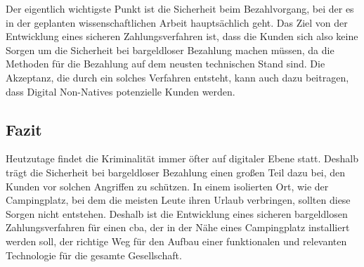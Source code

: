 Der eigentlich wichtigste Punkt ist die Sicherheit beim Bezahlvorgang, bei der es in der geplanten wissenschaftlichen 
Arbeit hauptsächlich geht. Das Ziel von der Entwicklung eines sicheren Zahlungsverfahren ist, dass die Kunden sich
also keine Sorgen um die Sicherheit bei bargeldloser Bezahlung machen müssen, da die Methoden für die Bezahlung 
auf dem neusten technischen Stand sind. Die Akzeptanz, die durch ein solches Verfahren entsteht, kann auch dazu beitragen,
dass Digital Non-Natives potenzielle Kunden werden.

\subsection{Fazit}

Heutzutage findet die Kriminalität immer öfter auf digitaler Ebene statt. Deshalb trägt die Sicherheit bei 
bargeldloser Bezahlung einen großen Teil dazu bei, den Kunden vor solchen Angriffen zu schützen. In einem isolierten Ort, wie der Campingplatz, bei dem die meisten 
Leute ihren Urlaub verbringen, sollten diese Sorgen nicht entstehen. Deshalb ist die Entwicklung eines sicheren
bargeldlosen Zahlungsverfahren für einen \acrfull{cba}, der in der Nähe eines Campingplatz installiert werden soll,
der richtige Weg für den Aufbau einer funktionalen und relevanten Technologie für die gesamte Gesellschaft.